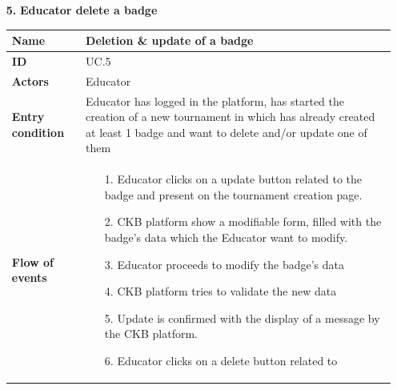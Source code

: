 \documentclass{article}
\begin{document}
{\begin{enumerate}
                    \item[\textbf{5.}] \textbf{Educator delete a badge}
                    \begin{xltabular}{\textwidth}
                        {| >{\raggedright\arraybackslash}g | >{\raggedright\arraybackslash}X |}      
                        \hline
                        \endfirsthead
                        \hline
                        \endhead
                        \endfoot
                        \hline
                        \endlastfoot
                        

                        
                        
                        \textbf{Name} & Deletion \& update of a badge\\
                        \hline
                        \textbf{ID} & UC.5\\
                        \hline
                        \textbf{Actors} & Educator\\
                        \hline
                        \textbf{Entry condition} & Educator has logged in the platform, has started the creation of a new
                        tournament in which has already created at least 1 badge and want to delete and/or update one of them\\
                        \hline
                        \textbf{Flow of events} &    \begin{enumerate}
                                                        \item[1.] Educator clicks on a update button related to the badge and 
                                                        present on the tournament creation page. 
                                                        \item[2.] CKB platform show a modifiable form, filled with the 
                                                        badge's data which the Educator want to modify.
                                                        \item[3.] Educator proceeds to modify the badge's data
                                                        \item[4.] CKB platform tries to validate the new data
                                                        \item[5.] Update is confirmed with the display of a message by the CKB platform. 
                                                        \item[6.] Educator clicks on a delete button related to 

\end{enumerate}
\end{xltabular}
\end{enumerate}}
\end{document}
